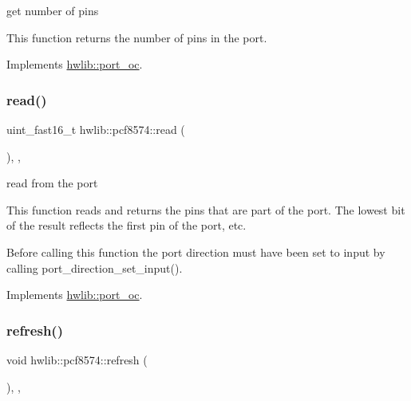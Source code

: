 get number of pins

This function returns the number of pins in the port. 

Implements \hyperlink{classhwlib_1_1port__oc_a44d0dbfde290ad17237ad70c09a4c402}{hwlib\+::port\+\_\+oc}.

\mbox{\label{classhwlib_1_1pcf8574_abf68953d24063469d4cbb867f87d3b5d}} 
\subsubsection{\texorpdfstring{read()}{read()}}
{\footnotesize\ttfamily uint\+\_\+fast16\+\_\+t hwlib\+::pcf8574\+::read (\begin{DoxyParamCaption}{ }\end{DoxyParamCaption})\hspace{0.3cm}{\ttfamily [inline]}, {\ttfamily [override]}, {\ttfamily [virtual]}}





read from the port

This function reads and returns the pins that are part of the port. The lowest bit of the result reflects the first pin of the port, etc.

Before calling this function the port direction must have been set to input by calling port\+\_\+direction\+\_\+set\+\_\+input(). 

Implements \hyperlink{classhwlib_1_1port__oc_a422b02326f14332df44863adced18427}{hwlib\+::port\+\_\+oc}.

\mbox{\label{classhwlib_1_1pcf8574_a6a82756c72f3f2599914cec45c8ed900}} 
\subsubsection{\texorpdfstring{refresh()}{refresh()}}
{\footnotesize\ttfamily void hwlib\+::pcf8574\+::refresh (\begin{DoxyParamCaption}{ }\end{DoxyParamCaption})\hspace{0.3cm}{\ttfamily [inline]}, {\ttfamily [override]}, {\ttfamily [virtual]}}





